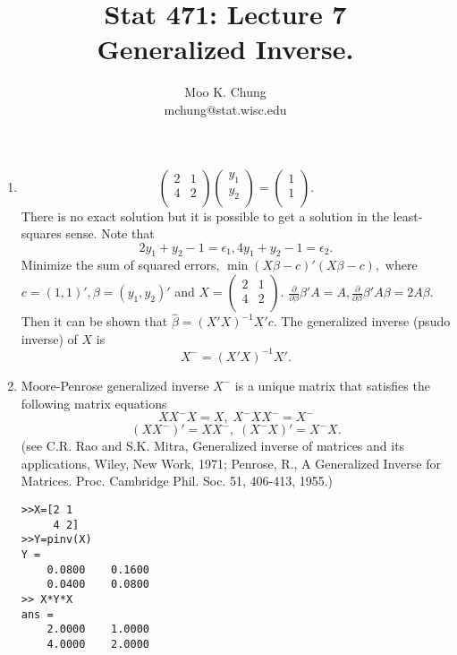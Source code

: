 \documentclass[11pt,twocolumn]{article} %
\begin{document}
\title{Stat 471: Lecture 7\\
Generalized Inverse.}
\author{Moo K. Chung\\
mchung@stat.wisc.edu}
\maketitle \thispagestyle{empty}

\begin{enumerate}


\item $$\left(%
\begin{array}{cc}
  2 & 1 \\
  4 & 2 \\
\end{array}%
\right)\left(%
\begin{array}{c}
  y_1 \\
  y_2 \\
\end{array}%
\right) = \left(%
\begin{array}{c}
  1 \\
  1 \\
\end{array}%
\right).$$ There is no exact solution but it is possible to get a
solution in the least-squares sense. Note that
$$2y_1 + y_2 -1 = \epsilon_1, 4y_1 + y_2 -1 = \epsilon_2.$$
Minimize the sum of squared errors, $\min (X\beta -c)'(X\beta-c),$
where $c=(1,1)', \beta=(y_1,y_2)'$ and $X=\left(%
\begin{array}{cc}
  2 & 1 \\
  4 & 2 \\
\end{array}%
\right).$ $\frac{\partial}{\partial \beta} \beta'A = A,
\frac{\partial}{\partial \beta} \beta'A\beta = 2A\beta.$ Then it
can be shown that $\hat \beta = (X'X)^{-1}X'c$. The generalized
inverse (psudo inverse) of $X$ is $$X^{-}=(X'X)^{-1}X'.$$

\item Moore-Penrose generalized inverse $X^{-}$ is a unique matrix
that satisfies the following matrix equations
$$XX^{-}X=X, \; X^{-}XX^{-} = X^{-}$$
$$(XX^{-})'=XX^{-}, \; (X^{-}X)'=X^{-}X.$$
(see C.R. Rao and S.K. Mitra, Generalized inverse of matrices and
its applications, Wiley, New Work, 1971; Penrose, R., A
Generalized Inverse for Matrices. Proc. Cambridge Phil. Soc. 51,
406-413, 1955.)
\begin{verbatim}
>>X=[2 1
     4 2]
>>Y=pinv(X)
Y =
    0.0800    0.1600
    0.0400    0.0800
>> X*Y*X
ans =
    2.0000    1.0000
    4.0000    2.0000
\end{verbatim}


\end{enumerate}
\end{document}
